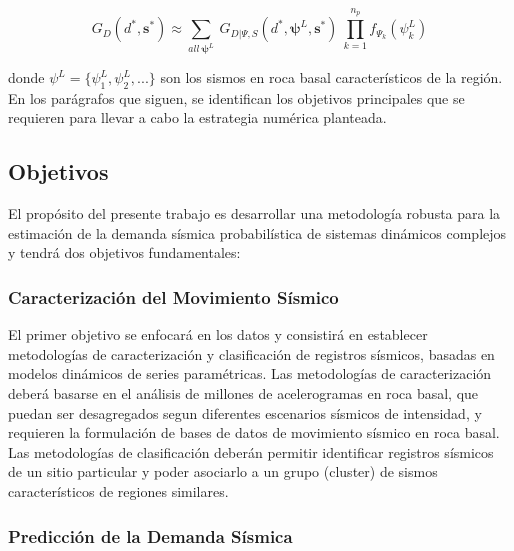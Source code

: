\documentclass[
]{krantz}
\begin{document}
\[ \begin{equation} 
G_D(d^*,\pmb {s^*}) \approx \sum^{}_{all \ \pmb\psi^L} \  G_{D|\Psi,S} \left( d^*,\pmb\psi^L, \pmb s^* \right ) \  \prod^{n_p}_{k=1}{f_{\Psi_k}(\psi_k^L)} 
\end{equation} \]

donde \(\psi^L = \{ \psi_1^L,\psi_2^L,... \}\) son los sismos en roca basal característicos de la región. En los parágrafos que siguen, se identifican los objetivos principales que se requieren para llevar a cabo la estrategia numérica planteada.

\hypertarget{objetivos}{%
\subsection*{Objetivos}\label{objetivos}}

El propósito del presente trabajo es desarrollar una metodología robusta para la estimación de la demanda sísmica probabilística de sistemas dinámicos complejos y tendrá dos objetivos fundamentales:

\hypertarget{caracterizaciuxf3n-del-movimiento-suxedsmico}{%
\subsubsection*{Caracterización del Movimiento Sísmico}\label{caracterizaciuxf3n-del-movimiento-suxedsmico}}

El primer objetivo se enfocará en los datos y consistirá en establecer metodologías de caracterización y clasificación de registros sísmicos, basadas en modelos dinámicos de series paramétricas. Las metodologías de caracterización deberá basarse en el análisis de millones de acelerogramas en roca basal, que puedan ser desagregados segun diferentes escenarios sísmicos de intensidad, y requieren la formulación de bases de datos de movimiento sísmico en roca basal. Las metodologías de clasificación deberán permitir identificar registros sísmicos de un sitio particular y poder asociarlo a un grupo (cluster) de sismos característicos de regiones similares.

\hypertarget{predicciuxf3n-de-la-demanda-suxedsmica}{%
\subsubsection*{Predicción de la Demanda Sísmica}\label{predicciuxf3n-de-la-demanda-suxedsmica}}
\end{document}

